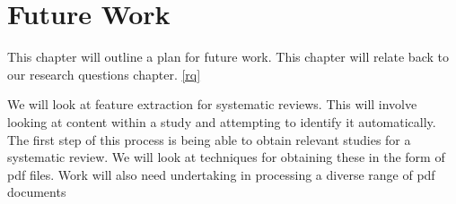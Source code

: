 \chapter{Future Work} \label{fw}

This chapter will outline a plan for future work. This chapter will relate back to our research questions chapter. \ref{rq}

We will look at feature extraction for systematic reviews. This will involve looking at content within a study and attempting to identify it automatically. The first step of this process is being able to obtain relevant studies for a systematic review. We will look at techniques for obtaining these in the form of pdf files. Work will also need undertaking in processing a diverse range of pdf documents 




